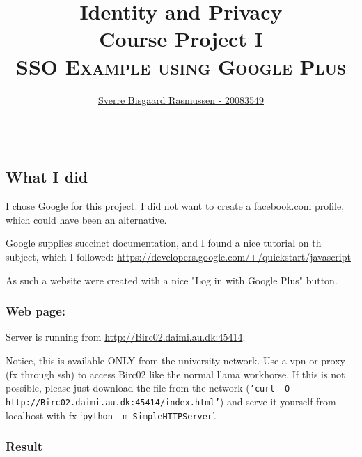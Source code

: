 \documentclass[12pt, a4paper]{article}
\begin{document}
\title{\small Identity and Privacy\\
       Course Project I\\
       \huge \textsc{SSO Example using Google Plus}\\
       }
       \author{
        \href{mailto:sverre@cs.au.dk}{Sverre Bisgaard Rasmussen - 20083549}\\
       }

\maketitle
\hrule

\subsection*{What I did}
I chose Google for this project. I did not want to create a facebook.com
profile, which could have been an alternative.

Google supplies succinct documentation, and I found a nice tutorial on
th subject, which I followed:
\url{https://developers.google.com/+/quickstart/javascript}

As such a website were created with a nice "Log in with Google Plus"
button.

\subsubsection*{Web page:}
\begin{comment}
\url{http://localhost:45414}, \url{http://birc02.daimi.au.dk:45414}

\subsubsection*{Client Id:}
\url{405157659036-hd07ho25rj6bhen0v5taq7pod4ifm25f.apps.googleusercontent.com}
\end{comment}

Server is running from \url{http://Birc02.daimi.au.dk:45414}.

Notice, this is available ONLY from the university network. Use a vpn or
proxy (fx through ssh) to access Birc02 like the normal llama workhorse.
If this is not possible, please just download the file from the network
({\tt 'curl -O http://Birc02.daimi.au.dk:45414/index.html'}) and serve
it yourself from localhost with fx ‘{\tt python -m SimpleHTTPServer}’.

\subsubsection*{Result}
\end{document}
